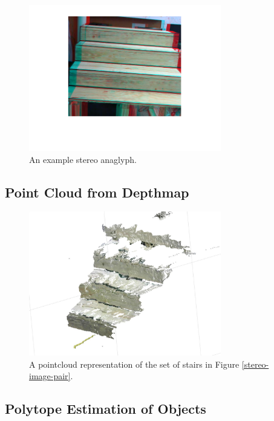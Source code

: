 \begin{figure}[!h]
\centering
\includegraphics[width=3.3in]{Sections/Figures/stereo_anaglyph.png}
\caption{An example stereo anaglyph.}
\label{stereo-anaglyph}
\end{figure}

\subsection{Point Cloud from Depthmap}

\begin{figure}[!h]
\centering
\includegraphics[width=3.3in]{Sections/Figures/example_stairs_pointcloud.jpg}
\caption{A pointcloud representation of the set of stairs in Figure \ref{stereo-image-pair}.}
\label{pointcloud-example}
\end{figure}

\subsection{Polytope Estimation of Objects}

